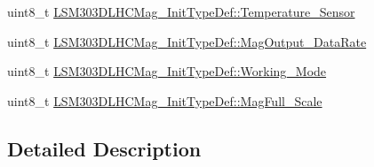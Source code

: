 \begin{DoxyCompactItemize}
\item 
uint8\+\_\+t \hyperlink{group__Mag__Temperature__Sensor_ga9eb2111bb813c41e41c4b008fa31fcb5}{L\+S\+M303\+D\+L\+H\+C\+Mag\+\_\+\+Init\+Type\+Def\+::\+Temperature\+\_\+\+Sensor}
\item 
uint8\+\_\+t \hyperlink{group__Mag__Temperature__Sensor_gae9edd3550ee6625372e2214e46603464}{L\+S\+M303\+D\+L\+H\+C\+Mag\+\_\+\+Init\+Type\+Def\+::\+Mag\+Output\+\_\+\+Data\+Rate}
\item 
uint8\+\_\+t \hyperlink{group__Mag__Temperature__Sensor_ga8d09b3ff9abb633788f5c869c77b9695}{L\+S\+M303\+D\+L\+H\+C\+Mag\+\_\+\+Init\+Type\+Def\+::\+Working\+\_\+\+Mode}
\item 
uint8\+\_\+t \hyperlink{group__Mag__Temperature__Sensor_ga68144d5d18ac0e3b151bcdb4ef4e8e04}{L\+S\+M303\+D\+L\+H\+C\+Mag\+\_\+\+Init\+Type\+Def\+::\+Mag\+Full\+\_\+\+Scale}
\end{DoxyCompactItemize}


\subsection{Detailed Description}



